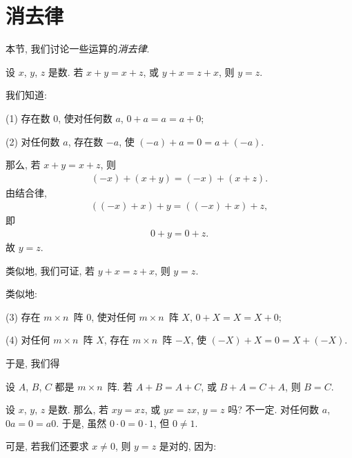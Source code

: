 \documentclass[../libro.tex]{subfiles}
\begin{document}

\section{消去律}

本节, 我们讨论一些运算的\emph{消去律}.

\begin{theorem}
    设 \(x\), \(y\), \(z\) 是数.
    若 \(x + y = x + z\), 或 \(y + x = z + x\),
    则 \(y = z\).
\end{theorem}

我们知道:

(1)
存在数 \(0\), 使对任何数 \(a\),  \(0 + a = a = a + 0\);

(2)
对任何数 \(a\), 存在数 \(-a\), 使 \((-a) + a = 0 = a + (-a)\).

那么, 若 \(x + y = x + z\),
则
\begin{align*}
    (-x) + (x + y) = (-x) + (x + z).
\end{align*}
由结合律,
\begin{align*}
    ((-x) + x) + y = ((-x) + x) + z,
\end{align*}
即
\begin{align*}
    0 + y = 0 + z.
\end{align*}
故 \(y = z\).

类似地, 我们可证,
若 \(y + x = z + x\), 则 \(y = z\).

类似地:

(3)
存在 \(m \times n\)~阵 \(0\),
使对任何 \(m \times n\)~阵 \(X\),
\(0 + X = X = X + 0\);

(4)
对任何 \(m \times n\)~阵 \(X\),
存在 \(m \times n\)~阵 \(-X\),
使 \((-X) + X = 0 = X + (-X)\).

于是, 我们得

\begin{theorem}
    设 \(A\), \(B\), \(C\) 都是 \(m \times n\)~阵.
    若 \(A + B = A + C\), 或 \(B + A = C + A\),
    则 \(B = C\).
\end{theorem}

设 \(x\), \(y\), \(z\) 是数.
那么, 若 \(xy = xz\), 或 \(yx = zx\),
\(y = z\) 吗?
不一定.
对任何数 \(a\), \(0a = 0 = a0\).
于是, 虽然 \(0 \cdot 0 = 0 \cdot 1\),
但 \(0 \neq 1\).

可是, 若我们还要求 \(x \neq 0\), 则 \(y = z\) 是对的,
因为:
\end{document}
